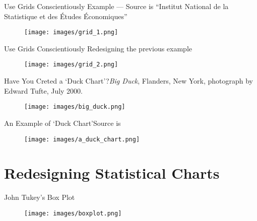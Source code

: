 \documentclass[aspectratio=1610]{beamer}
\begin{document}
\begin{frame}
	{Use Grids Conscientiously}
	{Example --- Source is ``Institut National de la Statistique et des
		\'Etudes \'Economiques''}
	\centering
	\begin{figure}
		\texttt{[image: images/grid\_1.png]}
	\end{figure}
\end{frame}

\begin{frame}
	{Use Grids Conscientiously}
	{Redesigning the previous example}
	\centering
	\begin{figure}
		\texttt{[image: images/grid\_2.png]}
	\end{figure}
\end{frame}

\begin{frame}{Have You Creted a `Duck Chart'?}{\textit{Big Duck}, Flanders,
		New York, photograph by Edward Tufte, July 2000.}
	\begin{figure}
		\begin{center}
			\texttt{[image: images/big\_duck.png]}
		\end{center}
	\end{figure}
\end{frame}

\begin{frame}{An Example of `Duck Chart'}{Source is \cite[][page 118]{tufte2001}}
	\begin{figure}
		\begin{center}
			\texttt{[image: images/a\_duck\_chart.png]}
		\end{center}
	\end{figure}
\end{frame}

\section{Redesigning Statistical Charts}

\begin{frame}{John Tukey's Box Plot}{}
	\begin{figure}
		\begin{center}
			\texttt{[image: images/boxplot.png]}
		\end{center}
	\end{figure}
\end{frame}
\end{document}
